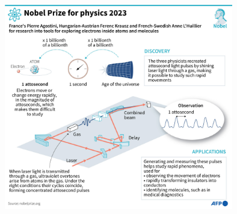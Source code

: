 \documentclass[12pt,brazil]{beamer}
\begin{document}

\begin{frame}
\begin{figure}
        \includegraphics[width=10cm]{figuras/fig_n02}
      \end{figure}
\end{frame}



\end{document}
